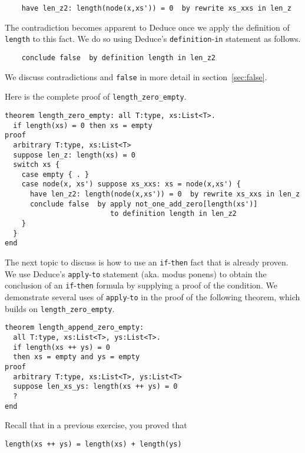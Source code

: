 \documentclass[12pt]{article}
\begin{document}
\begin{verbatim}
    have len_z2: length(node(x,xs')) = 0  by rewrite xs_xxs in len_z
\end{verbatim}

The contradiction becomes apparent to Deduce once we apply the
definition of \texttt{length} to this fact. We do so using Deduce's
\texttt{definition}-\texttt{in} statement as follows. 

\begin{verbatim}
    conclude false  by definition length in len_z2
\end{verbatim}

We discuss contradictions and \texttt{false} in more detail in
section~\ref{sec:false}.

Here is the complete proof of \texttt{length\_zero\_empty}.

\begin{verbatim}
theorem length_zero_empty: all T:type, xs:List<T>.
  if length(xs) = 0 then xs = empty
proof
  arbitrary T:type, xs:List<T>
  suppose len_z: length(xs) = 0
  switch xs {
    case empty { . }
    case node(x, xs') suppose xs_xxs: xs = node(x,xs') {
	  have len_z2: length(node(x,xs')) = 0  by rewrite xs_xxs in len_z
      conclude false  by apply not_one_add_zero[length(xs')]
                         to definition length in len_z2
    }
  }
end
\end{verbatim}

The next topic to discuss is how to use an \texttt{if}-\texttt{then}
fact that is already proven.  We use Deduce's
\texttt{apply}-\texttt{to} statement (aka. modus ponens) to obtain the
conclusion of an \texttt{if}-\texttt{then} formula by supplying a
proof of the condition.  We demonstrate several uses of
\texttt{apply}-\texttt{to} in the proof of the following theorem,
which builds on \texttt{length\_zero\_empty}.

\begin{verbatim}
theorem length_append_zero_empty: 
  all T:type, xs:List<T>, ys:List<T>.
  if length(xs ++ ys) = 0
  then xs = empty and ys = empty
proof
  arbitrary T:type, xs:List<T>, ys:List<T>
  suppose len_xs_ys: length(xs ++ ys) = 0
  ?
end
\end{verbatim}

Recall that in a previous exercise, you proved that

\begin{verbatim}
length(xs ++ ys) = length(xs) + length(ys)
\end{verbatim}
\end{document}
